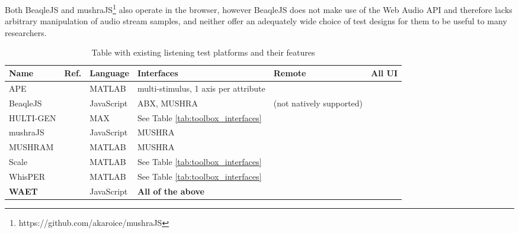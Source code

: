 \documentclass{sig-alternate}
\begin{document}
	Both BeaqleJS \cite{beaqlejs} and mushraJS\footnote{https://github.com/akaroice/mushraJS} also operate in the browser, however BeaqleJS does not make use of the Web Audio API and therefore lacks arbitrary manipulation of audio stream samples, and neither offer an adequately wide choice of test designs for them to be useful to many researchers. %
	
	\begin{table*}[ht]
    \caption{Table with existing listening test platforms and their features}
    \begin{center}
    	\begin{tabular}{|*{6}{l|}}
    		\hline
    		\textbf{Name} 	& \textbf{Ref.} 	& \textbf{Language} 	& \textbf{Interfaces} 			& \textbf{Remote} 			& \textbf{All UI} 	\\
    		\hline
    		APE 			& \cite{ape}		& MATLAB				& multi-stimulus, 1 axis per attribute 	& 					& 			 \\
    		BeaqleJS		& \cite{beaqlejs}	& JavaScript			& ABX, MUSHRA 					& (not natively supported) 	& 			 \\
    		HULTI-GEN 		& \cite{hultigen}	& MAX 					& See Table \ref{tab:toolbox_interfaces}								& 							& \checkmark \\
    		mushraJS		& 					& JavaScript 			& MUSHRA 						& \checkmark				& 	 \\
    		MUSHRAM			& \cite{mushram}	& MATLAB				& MUSHRA						& 							& 			 \\
    		Scale 			& \cite{scale}		& MATLAB				& See Table \ref{tab:toolbox_interfaces} &								&							&			 \\
    		WhisPER			& \cite{whisper}	& MATLAB				& See Table \ref{tab:toolbox_interfaces}								&							& \checkmark \\
    		\textbf{WAET}	& \cite{waet}		& JavaScript			& \textbf{All of the above}				& \checkmark				& \checkmark \\
    		\hline
    	\end{tabular}
    \end{center}
    \label{tab:toolboxes}
    \end{table*}%
\end{document}
